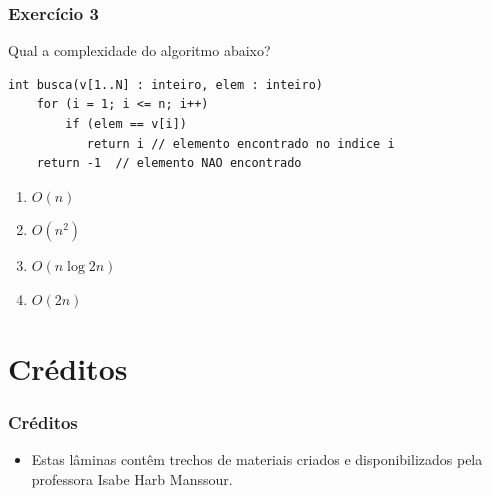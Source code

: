 \documentclass[aspectratio=169]{beamer}
\begin{document}
\begin{frame}[fragile]\frametitle{Exercício 3} %
Qual a complexidade do algoritmo abaixo?
{\scriptsize
\begin{verbatim}
int busca(v[1..N] : inteiro, elem : inteiro)
    for (i = 1; i <= n; i++)
        if (elem == v[i])
           return i // elemento encontrado no indice i
    return -1  // elemento NAO encontrado
\end{verbatim}
}
\begin{enumerate}[A]
	\item $O(n)$ %
	\item $O(n^2)$
	\item $O(n \log 2n)$
	\item $O(2n)$
\end{enumerate}
\end{frame}

\section{Créditos}

\begin{frame}\frametitle{Créditos}
\begin{itemize}
	\item Estas lâminas contêm trechos de materiais criados e disponibilizados pela professora Isabe Harb Manssour.
\end{itemize}
\end{frame}

\end{document}
